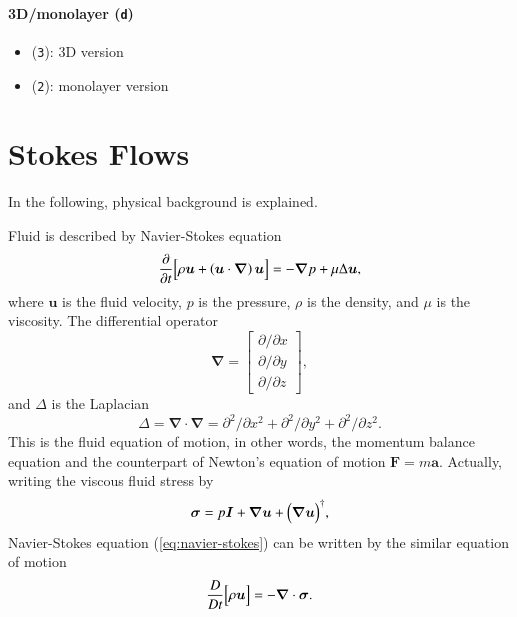 \documentclass{book}
\begin{document}
\paragraph{3D/monolayer ({\tt d})}
\begin{itemize}
\item ({\tt 3}): 3D version
\item ({\tt 2}): monolayer version
\end{itemize}


\section{Stokes Flows}
In the following, physical background is explained.

Fluid is described by Navier-Stokes equation
\begin{equation}
  \frac{\partial}{\partial t}
  \Bigl[
    \rho
    \bm{u}
    +
    \left(
      \bm{u}
      \cdot
      \bm{\nabla}
    \right)
    \bm{u}
  \Bigr]
  =
  -
  \bm{\nabla}
  p
  +
  \mu
  \Delta
  \bm{u}
  ,
  \label{eq:navier-stokes}
\end{equation}
where $\bm{u}$ is the fluid velocity,
$p$ is the pressure, $\rho$ is the density,
and $\mu$ is the viscosity.
The differential operator
\begin{equation}
  \bm{\nabla}
  =
  \left[
    \begin{array}{c}
      \partial/\partial x\\
      \partial/\partial y\\
      \partial/\partial z
    \end{array}
  \right]
  ,
\end{equation}
and $\Delta$ is the Laplacian
\begin{equation}
  \Delta
  =
  \bm{\nabla}
  \cdot
  \bm{\nabla}
  =
  \partial^2/\partial x^2
  +
  \partial^2/\partial y^2
  +
  \partial^2/\partial z^2
  .
\end{equation}
This is the fluid equation of motion, in other words,
the momentum balance equation and the counterpart of
Newton's equation of motion $\bm{F} = m\bm{a}$.
Actually, writing the viscous fluid stress by
\begin{equation}
  \bm{\sigma}
  =
  p
  \bm{I}
  +
  \bm{\nabla}\bm{u}
  +
  \Bigl(
  \bm{\nabla}\bm{u}
  \Bigr)^\dagger
  ,
\end{equation}
Navier-Stokes equation (\ref{eq:navier-stokes}) can be written by
the similar equation of motion
\begin{equation}
  \frac{D}{D t}
  \Bigl[
    \rho
    \bm{u}
  \Bigr]
  =
  -
  \bm{\nabla}
  \cdot
  \bm{\sigma}
  .
\end{equation}
\end{document}
